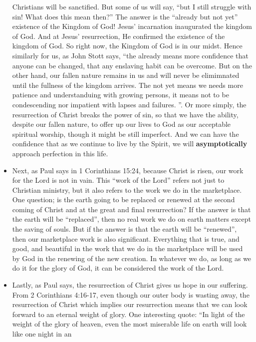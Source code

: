 \begin{itemize}
{  Christians will be sanctified.  But some of us will say, ``but I still
  struggle with sin!  What does this mean then?'' The answer is the ``already
  but not yet'' existence of the Kingdom of God!  Jesus' incarnation
  inaugurated the kingdom of God.  And at Jesus' resurrection, He confirmed
  the existence of the kingdom of God.  So right now, the Kingdom of God is
  in our midst.  Hence similarly for us, as John Stott says, ``the already
  means more confidence that anyone can be changed, that any enslaving habit
  can be overcome.  But on the other hand, our fallen nature remains in us
  and will never be elimimnated until the fullness of the kingdom arrives.
  The not yet means we needs more patience and understanduing with growing
  persons, it means not to be condescending nor impatient with lapses and
  failures.  ''.  Or more simply, the resurrection of Christ breaks the power
  of sin, so that we have the ability, despite our fallen nature, to offer up
  our lives to God as our acceptable spiritual worship, though it might be
  still imperfect.  And we can have the confidence that as we continue to
  live by the Spirit, we will \textbf{asymptotically} approach perfection in
  this life.  }
  \item{Next, as Paul says in 1 Corinthians 15:24, because Christ is risen,
  our work for the Lord is not in vain.  This ``work of the Lord'' refers not
  just to Christian ministry, but it also refers to the work we do in the
  marketplace.  One question; is the earth going to be replaced or renewed at
  the second coming of Christ and at the great and final resurrection?  If
  the answer is that the earth will be ``replaced'', then no real work we do
  on earth matters except the saving of souls.  But if the answer is that the
  earth will be ``renewed'', then our marketplace work is also significant.
  Everything that is true, and good, and beautiful in the work that we do in
  the marketplace will be used by God in the renewing of the new creation.
  In whatever we do, as long as we do it for the glory of God, it can be
  considered the work of the Lord.}
  \item{Lastly, as Paul says, the resurrection of Christ gives us hope in our
  suffering.  From 2 Corinthians 4:16-17, even though our outer body is
  wasting away, the resurrection of Christ which implies our resurrection
  means that we can look forward to an eternal weight of glory.  One
  interesting quote: ``In light of the weight of the glory of heaven, even
  the most miserable life on earth will look like one night in an
}
\end{itemize}
